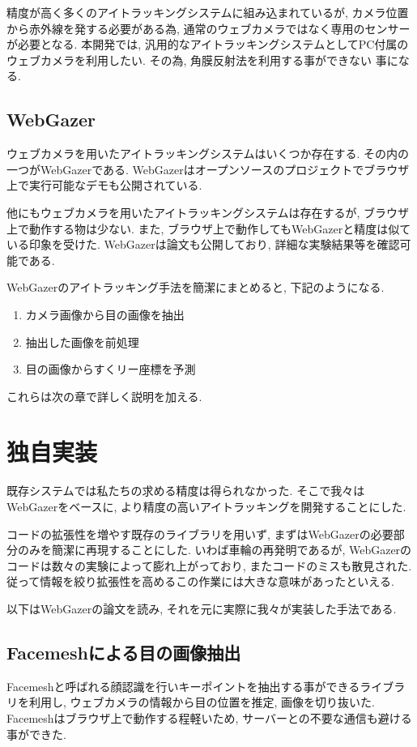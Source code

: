 \documentclass[a4paper,11pt]{jsarticle}
\begin{document}
精度が高く多くのアイトラッキングシステムに組み込まれているが, カメラ位置から赤外線を発する必要がある為, 通常のウェブカメラではなく専用のセンサーが必要となる.
本開発では, 汎用的なアイトラッキングシステムとしてPC付属のウェブカメラを利用したい. その為, 角膜反射法を利用する事ができない
事になる.

\subsection{WebGazer}
ウェブカメラを用いたアイトラッキングシステムはいくつか存在する. その内の一つがWebGazerである. 
WebGazerはオープンソースのプロジェクトでブラウザ上で実行可能なデモも公開されている. 

他にもウェブカメラを用いたアイトラッキングシステムは存在するが, ブラウザ上で動作する物は少ない. 
また, ブラウザ上で動作してもWebGazerと精度は似ている印象を受けた. WebGazerは論文も公開しており, 詳細な実験結果等を確認可能である. \cite{webgazer}

WebGazerのアイトラッキング手法を簡潔にまとめると, 下記のようになる.
\begin{enumerate}
  \item カメラ画像から目の画像を抽出
  \item 抽出した画像を前処理
  \item 目の画像からすくリー座標を予測
\end{enumerate}

これらは次の章で詳しく説明を加える.

\section{独自実装}
既存システムでは私たちの求める精度は得られなかった. 
そこで我々はWebGazerをベースに, より精度の高いアイトラッキングを開発することにした.

コードの拡張性を増やす既存のライブラリを用いず, まずはWebGazerの必要部分のみを簡潔に再現することにした.
いわば車輪の再発明であるが, WebGazerのコードは数々の実験によって膨れ上がっており, またコードのミスも散見された. 
従って情報を絞り拡張性を高めるこの作業には大きな意味があったといえる.

以下はWebGazerの論文を読み, それを元に実際に我々が実装した手法である.

\subsection{Facemeshによる目の画像抽出}
Facemeshと呼ばれる顔認識を行いキーポイントを抽出する事ができるライブラリを利用し, ウェブカメラの情報から目の位置を推定, 画像を切り抜いた. 
Facemeshはブラウザ上で動作する程軽いため, サーバーとの不要な通信も避ける事ができた.
\end{document}
